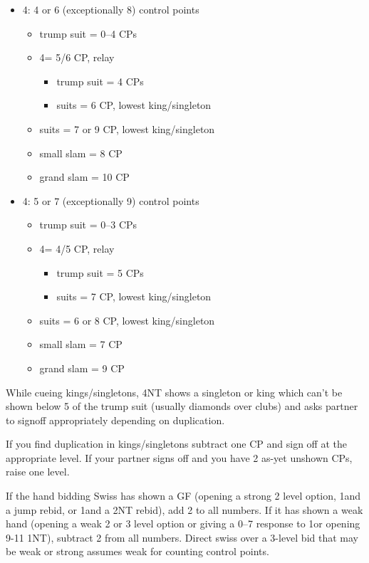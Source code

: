 \documentclass[a4paper,14pt]{extarticle}
\begin{document}
\begin{itemize}
\item 4\clubs: 4 or 6 (exceptionally 8) control points
	\begin{itemize}
   \item trump suit = 0--4 CPs
   \item 4\diamonds = 5/6 CP, relay
		\begin{itemize}
      \item trump suit = 4 CPs
      \item suits = 6 CP, lowest king/singleton
		\end{itemize}
   \item suits = 7 or 9 CP, lowest king/singleton
   \item small slam = 8 CP
   \item grand slam = 10 CP
	\end{itemize}

\item 4\diamonds: 5 or 7 (exceptionally 9) control points
	\begin{itemize}
   \item trump suit = 0--3 CPs
   \item 4\hearts = 4/5 CP, relay
		\begin{itemize}
      \item trump suit = 5 CPs
      \item suits = 7 CP, lowest king/singleton
		\end{itemize}
   \item suits = 6 or 8 CP, lowest king/singleton
   \item small slam = 7 CP
   \item grand slam = 9 CP
	\end{itemize}
\end{itemize}

While cueing kings/singletons, 4NT shows a singleton or king which can't be
shown below 5 of the trump suit (usually diamonds over clubs) and asks partner
to signoff appropriately depending on duplication.

If you find duplication in kings/singletons subtract one CP and sign off at the
appropriate level. If your partner signs off and you have 2 as-yet unshown CPs,
raise one level.

If the hand bidding Swiss has shown a GF (opening a strong 2 level option,
1\diamonds and a jump rebid, or 1\diamonds and a 2NT rebid), add 2 to
all numbers. If it has shown a weak hand (opening a weak 2 or 3 level option or
giving a 0--7 response to 1\diamonds or opening 9-11 1NT), subtract 2 from
all numbers. Direct swiss over a 3-level bid that may be weak or strong assumes
weak for counting control points.
\end{document}
